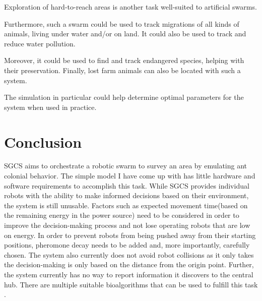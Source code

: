 \documentclass[a4paper, 12pt, twocolumn, times]{article}
\begin{document}
\par Exploration of hard-to-reach areas is another task well-suited to artificial swarms.
\par Furthermore, such a swarm could be used to track migrations of all kinds of animals, living under water and/or on land. It could also be used to track and reduce water pollution.
\par Moreover, it could be used to find and track endangered species, helping with their preservation. Finally, lost farm animals can also be located with such a system. 
\par The simulation in particular could help determine optimal parameters for the system when used in practice.  
\section{Conclusion}
SGCS aims to orchestrate a robotic swarm to survey an area by emulating ant colonial behavior. The simple model I have come up with has little hardware and software requirements to accomplish this task. While SGCS provides individual robots with the ability to make informed decisions based on their environment, the system is still unusable. Factors such as expected movement time(based on the remaining energy in the power source) need to be considered in order to improve the decision-making process and not lose operating robots that are low on energy. In order to prevent robots from being pushed away from their starting positions, pheromone decay needs to be added and, more importantly, carefully chosen. The system also currently does not avoid robot collisions as it only takes the decision-making is only based on the distance from the origin point. Further, the system currently has no way to report information it discovers to the central hub. There are multiple suitable bioalgorithms that can be used to fulfill this task \parencite{adler_information_1992}.
\printbibliography
\end{document}
